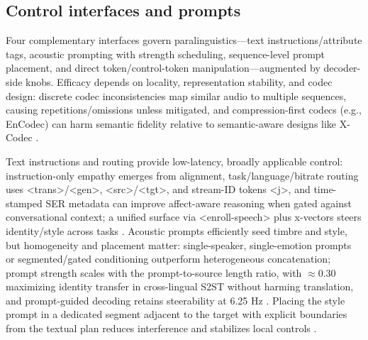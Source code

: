 \documentclass{article}
\begin{document}
\subsection{Control interfaces and prompts} \label{subsec:Control interfaces and prompts}
Four complementary interfaces govern paralinguistics---text instructions/attribute tags, acoustic prompting with strength scheduling, sequence-level prompt placement, and direct token/control-token manipulation---augmented by decoder-side knobs. Efficacy depends on locality, representation stability, and codec design: discrete codec inconsistencies map similar audio to multiple sequences, causing repetitions/omissions unless mitigated, and compression-first codecs (e.g., EnCodec) can harm semantic fidelity relative to semantic-aware designs like X-Codec \cite{liu2024analyzingmitigatinginconsistencydiscrete,ye2024codecdoesmatterexploringsemanticshortcom,fily2024establishingdegreesclosenessbetweenaudio}.

Text instructions and routing provide low-latency, broadly applicable control: instruction-only empathy emerges from alignment, task/language/bitrate routing uses <trans>/<gen>, <src>/<tgt>, and stream-ID tokens <j>, and time-stamped SER metadata can improve affect-aware reasoning when gated against conversational context; a unified surface via <enroll-speech> plus x-vectors steers identity/style across tasks \cite{wang2024blspemotowardsempatheticlargespeechlangu,peng2024mslms2stmultitaskspeechlanguagemodeltext,wang2025incorporatingcontextualparalinguisticund,wu2024speechcomposerunifyingmultiplespeechtask}. Acoustic prompts efficiently seed timbre and style, but homogeneity and placement matter: single-speaker, single-emotion prompts or segmented/gated conditioning outperform heterogeneous concatenation; prompt strength scales with the prompt-to-source length ratio, with $\approx$0.30 maximizing identity transfer in cross-lingual S2ST without harming translation, and prompt-guided decoding retains steerability at 6.25 Hz \cite{peng2024empiricalstudyspeechlanguagemodelsprompt,gong2024seamlessexpressivelmspeechlanguagemodele,wang2025tadicodectextawarediffusionspeechtokeniz}. Placing the style prompt in a dedicated segment adjacent to the target with explicit boundaries from the textual plan reduces interference and stabilizes local controls \cite{wu2024speechcomposerunifyingmultiplespeechtask}.
\end{document}
